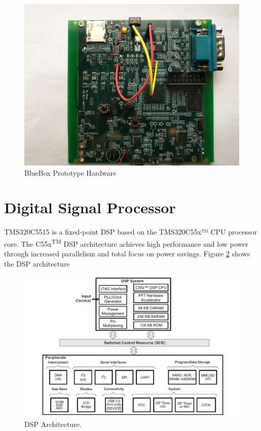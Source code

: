 \begin{figure}[h]
	\centering
	\includegraphics[scale = 0.08]{BlueBox_Hardware.jpg}
	\caption{BlueBox Prototype Hardware \label{BlueBox_Hardware}}
\end{figure} 
\section{Digital Signal Processor}
TMS320C5515 is a fixed-point DSP based on the TMS320C55x™ CPU processor core. The C55x\textsuperscript{TM} DSP architecture achieves high performance and low power through increased parallelism and total focus on power savings. Figure \ref{C5515 Architecture} shows the DSP architecture

\begin{figure}[h]
	\centering
	\includegraphics[scale = 0.75 ]{C5515_arch.JPG}
	\caption{DSP Architecture. \cite{tms320c5515}\label{C5515 Architecture}}
\end{figure} 
